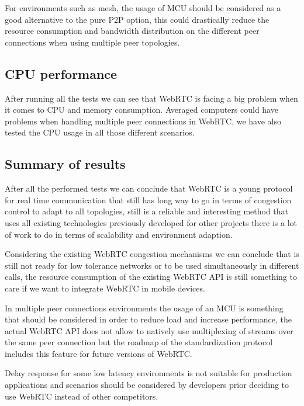For environments such as mesh, the usage of MCU should be considered as a good alternative to the pure P2P option, this could drastically reduce the resource consumption and bandwidth distribution on the different peer connections when using multiple peer topologies.

\subsection{CPU performance}

After running all the tests we can see that WebRTC is facing a big problem when it comes to CPU and memory consumption. Averaged computers could have problems when handling multiple peer connections in WebRTC, we have also tested the CPU usage in all those different scenarios. 

\subsection{Summary of results}

After all the performed tests we can conclude that WebRTC is a young protocol for real time communication that still has long way to go in terms of congestion control to adapt to all topologies, still is a reliable and interesting method that uses all existing technologies previously developed for other projects there is a lot of work to do in terms of scalability and environment adaption. 

Considering the existing WebRTC congestion mechanisms we can conclude that is still not ready for low tolerance networks or to be used simultaneously in different calls, the resource consumption of the existing WebRTC API is still something to care if we want to integrate WebRTC in mobile devices.

In multiple peer connections environments the usage of an MCU is something that should be considered in order to reduce load and increase performance, the actual WebRTC API does not allow to natively use multiplexing of streams over the same peer connection but the roadmap of the standardization protocol includes this feature for future versions of WebRTC.

Delay response for some low latency environments is not suitable for production applications and scenarios should be considered  by developers prior deciding to use WebRTC instead of other competitors.